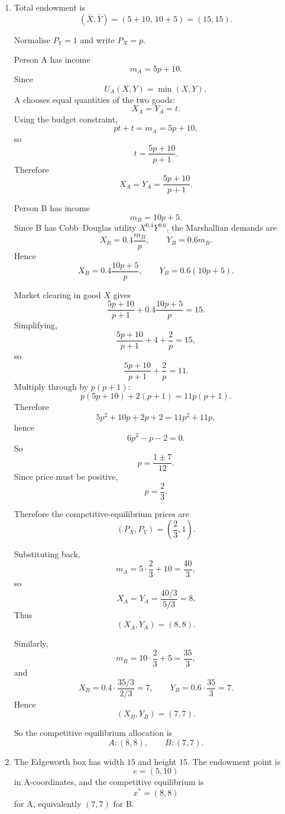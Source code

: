 \documentclass[12pt]{article}
\begin{document}
\begin{enumerate}[label=(\alph*)]
    \item
    Total endowment is
    \[
    (\bar X,\bar Y)=(5+10,\,10+5)=(15,15).
    \]

    Normalise \(P_Y=1\) and write \(P_X=p\).

    Person A has income
    \[
    m_A=5p+10.
    \]
    Since
    \[
    U_A(X,Y)=\min(X,Y),
    \]
    A chooses equal quantities of the two goods:
    \[
    X_A=Y_A=t.
    \]
    Using the budget constraint,
    \[
    pt+t=m_A=5p+10,
    \]
    so
    \[
    t=\frac{5p+10}{p+1}.
    \]
    Therefore
    \[
    X_A=Y_A=\frac{5p+10}{p+1}.
    \]

    Person B has income
    \[
    m_B=10p+5.
    \]
    Since B has Cobb--Douglas utility \(X^{0.4}Y^{0.6}\), the Marshallian demands are
    \[
    X_B=0.4\frac{m_B}{p},
    \qquad
    Y_B=0.6m_B.
    \]
    Hence
    \[
    X_B=0.4\frac{10p+5}{p},
    \qquad
    Y_B=0.6(10p+5).
    \]

    Market clearing in good \(X\) gives
    \[
    \frac{5p+10}{p+1}+0.4\frac{10p+5}{p}=15.
    \]
    Simplifying,
    \[
    \frac{5p+10}{p+1}+4+\frac{2}{p}=15,
    \]
    so
    \[
    \frac{5p+10}{p+1}+\frac{2}{p}=11.
    \]
    Multiply through by \(p(p+1)\):
    \[
    p(5p+10)+2(p+1)=11p(p+1).
    \]
    Therefore
    \[
    5p^2+10p+2p+2=11p^2+11p,
    \]
    hence
    \[
    6p^2-p-2=0.
    \]
    So
    \[
    p=\frac{1\pm 7}{12}.
    \]
    Since price must be positive,
    \[
    p=\frac23.
    \]

    Therefore the competitive-equilibrium prices are
    \[
    (P_X,P_Y)=\left(\frac23,1\right).
    \]

    Substituting back,
    \[
    m_A=5\cdot\frac23+10=\frac{40}{3},
    \]
    so
    \[
    X_A=Y_A=\frac{40/3}{5/3}=8.
    \]
    Thus
    \[
    (X_A,Y_A)=(8,8).
    \]

    Similarly,
    \[
    m_B=10\cdot\frac23+5=\frac{35}{3},
    \]
    and
    \[
    X_B=0.4\cdot\frac{35/3}{2/3}=7,
    \qquad
    Y_B=0.6\cdot\frac{35}{3}=7.
    \]
    Hence
    \[
    (X_B,Y_B)=(7,7).
    \]

    So the competitive equilibrium allocation is
    \[
    A:(8,8),\qquad B:(7,7).
    \]
\newpage
    \item
    The Edgeworth box has width \(15\) and height \(15\). The endowment point is
    \[
    e=(5,10)
    \]
    in A-coordinates, and the competitive equilibrium is
    \[
    x^*=(8,8)
    \]
    for A, equivalently \((7,7)\) for B.


\end{enumerate}
\end{document}
